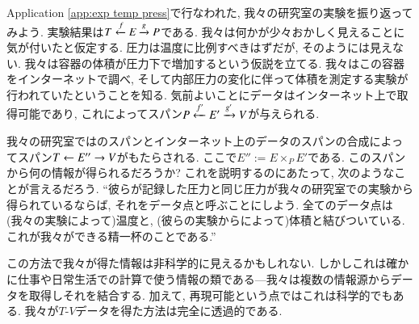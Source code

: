 \begin{application}\label{app:exp temp press 2}


Application \ref{app:exp temp press}で行なわれた, 我々の研究室の実験を振り返ってみよう. 実験結果は$T\xleftarrow{f}E\xrightarrow{g}P$である. 我々は何かが少々おかしく見えることに気が付いたと仮定する. 圧力は温度に比例すべきはずだが, そのようには見えない. 我々は容器の体積が圧力下で増加するという仮説を立てる. 我々はこの容器をインターネットで調べ, そして内部圧力の変化に伴って体積を測定する実験が行われていたということを知る. 気前よいことにデータはインターネット上で取得可能であり, これによってスパン$P\xleftarrow{f'}E'\xrightarrow{g'}V$が与えられる.


我々の研究室ではのスパンとインターネット上のデータのスパンの合成によってスパン$T\leftarrow E''\rightarrow V$がもたらされる. ここで$E'':=E\times_PE'$である. このスパンから何の情報が得られるだろうか? これを説明するのにあたって, 次のようなことが言えるだろう. ``彼らが記録した圧力と同じ圧力が我々の研究室での実験から得られているならば, それをデータ点と呼ぶことにしよう. 全てのデータ点は(我々の実験によって)温度と, (彼らの実験からによって)体積と結びついている. これが我々ができる精一杯のことである.''


この方法で我々が得た情報は非科学的に見えるかもしれない. しかしこれは確かに仕事や日常生活での計算で使う情報の類である---我々は複数の情報源からデータを取得しそれを結合する. 加えて, 再現可能という点ではこれは科学的でもある. 我々が$T$-$V$データを得た方法は完全に透過的である.


\end{application}


